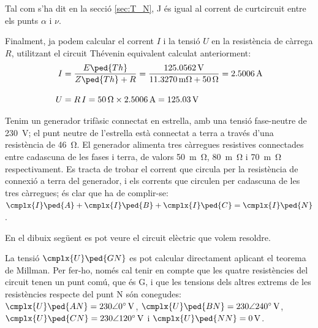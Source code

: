 \begin{exemple}
    Tal com s'ha dit en la secció \ref{sec:T_N}, J és igual al
    corrent de curtcircuit entre els punts $\alpha$ i $\nu$.

    Finalment, ja podem calcular el corrent $I$ i la tensió $U$ en la
    resistència de càrrega $R$, utilitzant el circuit Thévenin equivalent calculat anteriorment:
    \begin{align*}
        I &= \frac{E\ped{Th}}{Z\ped{Th} + R} = \frac{\qty{125,0562}{V}}
        {\qty{11,3270}{m\ohm} + \qty{50}{\ohm}} = \qty{2,5006}{A} \\[2ex]
        U &=  R \,I = \qty{50}{\ohm} \times \qty{2,5006}{A} =
        \qty{125,03}{V}
    \end{align*}
\end{exemple}


\begin{exemple}\label{ex:MillmanTrifNeutre}
	\addcontentsxms{\MillmanTrifNeutre}	
    Tenim un generador trifàsic connectat en estrella, amb una tensió fase-neutre de \qty{230}{V}; el punt neutre de l'estrella està connectat a terra a través d'una resistència de \qty{46}{\ohm}. El generador alimenta tres càrregues resistives connectades entre cadascuna de les fases i terra, de valors \qty{50}{m\ohm}, \qty{80}{m\ohm} i \qty{70}{m\ohm} respectivament. Es tracta de trobar el corrent que circula per la resistència de connexió a terra del generador, i els corrents que circulen per cadascuna de les tres càrregues; és clar que ha de complir-se: $\cmplx{I}\ped{A} + \cmplx{I}\ped{B} + \cmplx{I}\ped{C} = \cmplx{I}\ped{N}$.

    En el dibuix  següent es pot veure el circuit elèctric que  volem resoldre.

	 \begin{center}
		
	\end{center}

    La tensió $\cmplx{U}\ped{GN}$ es pot calcular directament aplicant el teorema de Millman. Per fer-ho, només cal tenir en compte que les quatre resistències del circuit tenen un punt comú, que és G, i que les tensions dels altres extrems de les resistències respecte del punt N són conegudes: $\cmplx{U}\ped{AN}=\complexqty{230:0}{V}$, $\cmplx{U}\ped{BN}=\complexqty{230:240}{V}$, $\cmplx{U}\ped{CN}=\complexqty{230:120}{V}$ i  $\cmplx{U}\ped{NN}=\qty{0}{V}$.


\end{exemple}
